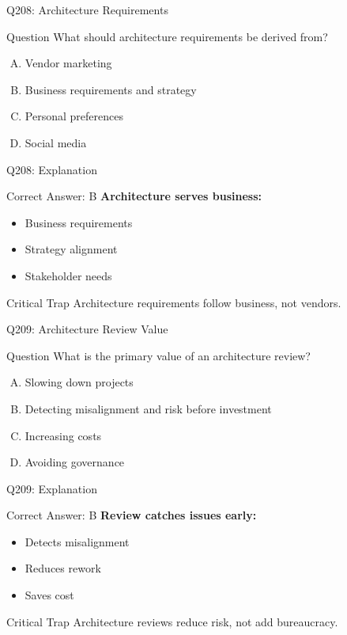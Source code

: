 \documentclass{beamer}
\begin{document}
	\begin{frame}{Q208: Architecture Requirements}
		\begin{block}{Question}
			What should architecture requirements be derived from?
		\end{block}
		\begin{enumerate}[(A)]
			\item Vendor marketing
			\item Business requirements and strategy
			\item Personal preferences
			\item Social media
		\end{enumerate}
	\end{frame}
	
	\begin{frame}{Q208: Explanation}
		\begin{block}{Correct Answer: B}
			\textbf{Architecture serves business:}
			\begin{itemize}
				\item Business requirements
				\item Strategy alignment
				\item Stakeholder needs
			\end{itemize}
		\end{block}
		\begin{alertblock}{Critical Trap}
			Architecture requirements follow business, not vendors.
		\end{alertblock}
	\end{frame}
	
	\begin{frame}{Q209: Architecture Review Value}
		\begin{block}{Question}
			What is the primary value of an architecture review?
		\end{block}
		\begin{enumerate}[(A)]
			\item Slowing down projects
			\item Detecting misalignment and risk before investment
			\item Increasing costs
			\item Avoiding governance
		\end{enumerate}
	\end{frame}
	
	\begin{frame}{Q209: Explanation}
		\begin{block}{Correct Answer: B}
			\textbf{Review catches issues early:}
			\begin{itemize}
				\item Detects misalignment
				\item Reduces rework
				\item Saves cost
			\end{itemize}
		\end{block}
		\begin{alertblock}{Critical Trap}
			Architecture reviews reduce risk, not add bureaucracy.
		\end{alertblock}
	\end{frame}
	
\end{document}
